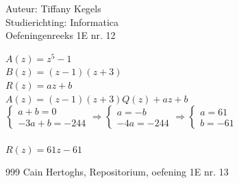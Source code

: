 \documentclass[a4paper]{article}
\begin{document}
  
\noindent \large Auteur: Tiffany Kegels \\
\noindent \large Studierichting: Informatica\\
\noindent \large Oefeningenreeks 1E nr. 12\\

\medskip

\normalsize

$A(z) = z^5 - 1$\\

$B(z) = (z-1)(z+3)$\\

$R(z) = az+b$\\

$A(z) = (z-1)(z+3)Q(z) + az + b$\\

$\left\{
	\begin{array}{l} 
		a + b = 0\\
		-3a + b = -244
	\end{array}
\right .
\Rightarrow
\left\{
	\begin{array}{l} 
		a = -b\\
		-4a = -244
	\end{array}
\right .
\Rightarrow
\left\{
	\begin{array}{l} 
		a = 61\\
		b = -61
	\end{array}
\right .$\\\\

$R(z) = 61z - 61$

\begin{thebibliography}{999}
 Cain Hertoghs, Repositorium, oefening 1E nr. 13

\end{thebibliography}
\end{document}
